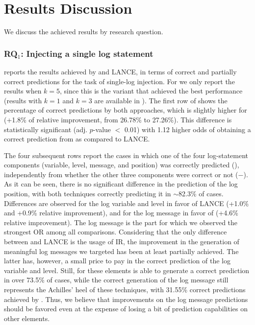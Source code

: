 \section{Results Discussion} \label{sec:results}

We discuss the achieved results by research question.


\subsubsection{RQ$_{1}$: Injecting a single log statement}
\label{sec:rq1}

 reports the results achieved by \approach and LANCE, in terms of correct and partially correct predictions for the task of single-log injection. For \approach we only report the results when $k=5$, since this is the variant that achieved the best performance (results with $k=1$ and $k=3$ are available in \cite{replication}). The first row of  shows the percentage of correct predictions by both approaches, which is slightly higher for \approach (+1.8\% of relative improvement, from 26.78\% to 27.26\%). This difference is statistically significant (adj. $p$-value $<$ 0.01) with 1.12 higher odds of obtaining a correct prediction from \approach as compared to LANCE. 



The four subsequent rows report the cases in which one of the four log-statement components (variable, level, message, and position) was correctly predicted (\cmark), independently from whether the other three components were correct or not ($-$). As it can be seen, there is no significant difference in the prediction of the log position, with both techniques correctly predicting it in $\sim$82.3\% of cases. Differences are observed for the log variable and level in favor of LANCE (+1.0\% and +0.9\% relative improvement), and for the log message in favor of \approach (+4.6\% relative improvement). The log message is the part for which we observed the strongest OR among all comparisons. Considering that the only difference between \approach and LANCE is the usage of IR, the improvement in the generation of meaningful log messages we targeted has been at least partially achieved. The latter has, however, a small price to pay in the correct prediction of the log variable and level. Still, for these elements \approach is able to generate a correct prediction in over 73.5\% of cases, while the correct generation of the log message still represents the Achilles' heel of these techniques, with 31.55\% correct predictions achieved by \approach. Thus, we believe that improvements on the log message predictions should be favored even at the expense of losing a bit of prediction capabilities on other elements. 

